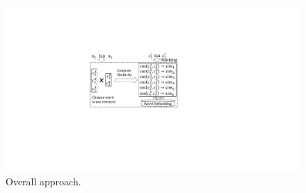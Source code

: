 \begin{figure}[ht]
	\centering
	\includegraphics[width=\columnwidth]{figures/approach}
	\caption{Overall approach.}
	\label{fig:approach}
\end{figure}